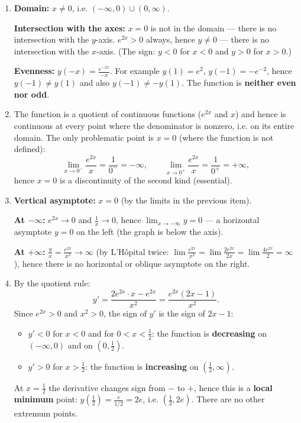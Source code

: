 \begin{solution}
\begin{enumerate}
  \item \textbf{Domain:} $x\neq0$, i.e. $(-\infty,0)\cup(0,\infty)$.

  \textbf{Intersection with the axes:} $x=0$ is not in the domain --- there is no intersection with the $y$-axis. $e^{2x}>0$ always, hence $y\ne0$ --- there is no intersection with the $x$-axis. (The sign: $y<0$ for $x<0$ and $y>0$ for $x>0$.)

  \textbf{Evenness:} $y(-x)=\frac{e^{-2x}}{-x}$. For example $y(1)=e^2$, $y(-1)=-e^{-2}$, hence $y(-1)\ne y(1)$ and also $y(-1)\ne -y(1)$. The function is \textbf{neither even nor odd}.

  \item The function is a quotient of continuous functions ($e^{2x}$ and $x$) and hence is continuous at every point where the denominator is nonzero, i.e. on its entire domain. The only problematic point is $x=0$ (where the function is not defined):
  \[ \lim_{x\to0^-}\frac{e^{2x}}{x}=\frac{1}{0^-}=-\infty,\qquad \lim_{x\to0^+}\frac{e^{2x}}{x}=\frac{1}{0^+}=+\infty, \]
  hence $x=0$ is a discontinuity of the second kind (essential).

  \item \textbf{Vertical asymptote:} $x=0$ (by the limits in the previous item).

  \textbf{At $-\infty$:} $e^{2x}\to0$ and $\frac1x\to0$, hence $\lim_{x\to-\infty}y=0$ --- a horizontal asymptote $y=0$ on the left (the graph is below the axis).

  \textbf{At $+\infty$:} $\frac{y}{x}=\frac{e^{2x}}{x^2}\to\infty$ (by L'Hôpital twice: $\lim\frac{e^{2x}}{x^2}=\lim\frac{2e^{2x}}{2x}=\lim\frac{4e^{2x}}{2}=\infty$), hence there is no horizontal or oblique asymptote on the right.

  \item By the quotient rule:
  \[ y'=\frac{2e^{2x}\cdot x - e^{2x}}{x^2} = \frac{e^{2x}(2x-1)}{x^2}. \]
  Since $e^{2x}>0$ and $x^2>0$, the sign of $y'$ is the sign of $2x-1$:
  \begin{itemize}
    \item $y'<0$ for $x<0$ and for $0<x<\frac12$: the function is \textbf{decreasing} on $(-\infty,0)$ and on $(0,\frac12)$.
    \item $y'>0$ for $x>\frac12$: the function is \textbf{increasing} on $(\frac12,\infty)$.
  \end{itemize}
  At $x=\frac12$ the derivative changes sign from $-$ to $+$, hence this is a \textbf{local minimum} point: $y(\tfrac12)=\frac{e}{1/2}=2e$, i.e. $(\frac12,2e)$. There are no other extremum points.


\end{enumerate}
\end{solution}
